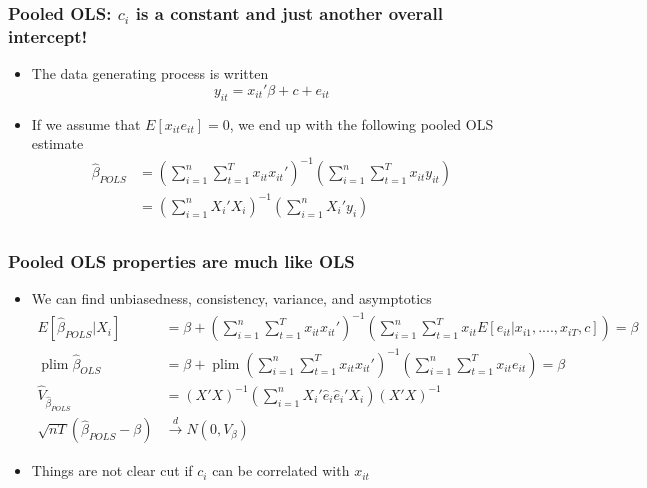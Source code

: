 \documentclass[aspectratio=169]{beamer}
\DeclareMathOperator*{\plim}{plim}
\begin{document}
\begin{frame}
\frametitle{Pooled OLS: $c_i$ is a constant and just another overall intercept!}
\begin{itemize}
\item The data generating process is written
\[
y_{it} = x_{it}'\beta + c + e_{it}
\]
\item If we assume that $E[x_{it}e_{it}]=0$, we end up with the following pooled OLS estimate 
\[
\begin{aligned}
\hat{\beta}_{POLS}&=\left(\sum_{i=1}^n\sum_{t=1}^Tx_{it}x_{it}'\right)^{-1}\left(\sum_{i=1}^n\sum_{t=1}^Tx_{it}y_{it}\right)\\
&=\left(\sum_{i=1}^nX_{i}'X_{i}\right)^{-1}\left(\sum_{i=1}^nX_{i}'y_{i}\right)\\
\end{aligned}
\]
\end{itemize}
\end{frame}

\begin{frame}
\frametitle{Pooled OLS properties are much like OLS}
\begin{itemize}
\item We can find unbiasedness, consistency, variance, and asymptotics
\[
\begin{aligned}
E[\hat{\beta}_{POLS}|X_i]&= \beta + \left(\sum_{i=1}^n\sum_{t=1}^Tx_{it}x_{it}'\right)^{-1}\left(\sum_{i=1}^n\sum_{t=1}^Tx_{it}E[e_{it}|x_{i1},....,x_{iT},c]\right)=\beta\\
\plim\hat{\beta}_{OLS}&=\beta+\plim\left(\sum_{i=1}^n\sum_{t=1}^Tx_{it}x_{it}'\right)^{-1}\left(\sum_{i=1}^n\sum_{t=1}^Tx_{it}e_{it}\right) = \beta\\
\widehat{V}_{\hat{\beta}_{POLS}}&= (X'X)^{-1}\left(\sum_{i=1}^n X_i'\hat{e}_i\hat{e}_i'X_i\right)(X'X)^{-1}\\
\sqrt{nT}(\hat{\beta}_{POLS}-\beta)&\xrightarrow{d}N(0,V_\beta)
\end{aligned}
\]
\item Things are not clear cut if $c_i$ can be correlated with $x_{it}$
\end{itemize}
\end{frame}
\end{document}
